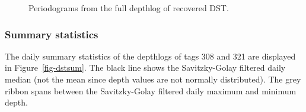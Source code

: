 \documentclass[
  authoryear,
  review,
  3p]{elsarticle}
\begin{document}
\begin{figure}

\begin{minipage}[t]{\linewidth}

{\centering 


}

\end{minipage}%
\newline
\begin{minipage}[t]{\linewidth}

{\centering 


}

\end{minipage}%

\caption{\label{fig-fft}Periodograms from the full depthlog of recovered
DST.}

\end{figure}

\hypertarget{sec-results-dst-summary}{%
\subsubsection{Summary statistics}\label{sec-results-dst-summary}}

The daily summary statistics of the depthlogs of tags 308 and 321 are
displayed in Figure~\ref{fig-dstsum}. The black line shows the
Savitzky-Golay filtered daily median (not the mean since depth values
are not normally distributed). The grey ribbon spans between the
Savitzky-Golay filtered daily maximum and minimum depth.
\end{document}
